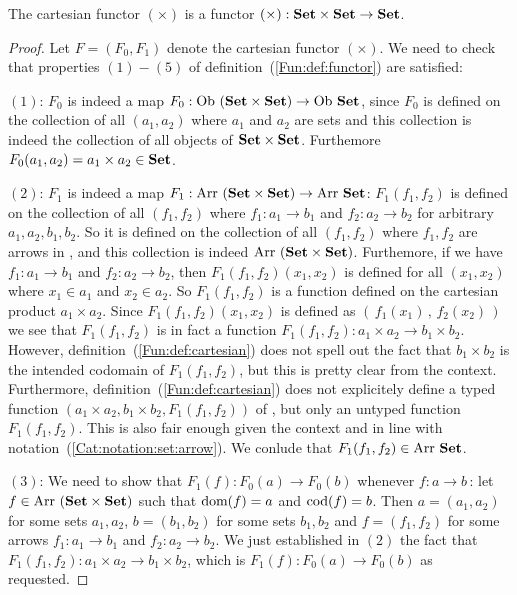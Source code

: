 \begin{prop}\label{Fun:prop:cartesian}
    The cartesian functor $(\times)$ is a functor $(\times):\mbox{\bf Set}\times\mbox{\bf Set}
    \to\mbox{\bf Set}$. 
\end{prop}
\begin{proof}
    Let $F=(F_{0},F_{1})$ denote the cartesian functor $(\times)$. We need
    to check that properties $(1)-(5)$ of definition~(\ref{Fun:def:functor}) 
    are satisfied:

    $(1)$: $F_{0}$ is indeed a map $F_{0}:\ob\ (\Set\times\Set)\to\ob\ \Set$, 
    since $F_{0}$ is defined on the collection of all $(a_{1},a_{2})$ where
    $a_{1}$ and $a_{2}$ are sets and this collection is indeed the collection
    of all objects of $\mbox{\bf Set}\times\mbox{\bf Set}$. Furthemore $F_{0}(a_{1},a_{2})=
    a_{1}\times a_{2}\in\mbox{\bf Set}$.

    $(2)$: $F_{1}$ is indeed a map $F_{1}:\arr\ (\Set\times\Set)\to\arr\ \Set$:
    $F_{1}(f_{1},f_{2})$ is defined on the collection of all $(f_{1},f_{2})$
    where $f_{1}:a_{1}\to b_{1}$ and $f_{2}:a_{2}\to b_{2}$ for arbitrary
    $a_{1}, a_{2}, b_{1}, b_{2}$. So it is defined on the collection of all
    $(f_{1},f_{2})$ where $f_{1},f_{2}$ are arrows in \Set, and this collection
    is indeed $\mbox{\rm Arr}\ (\mbox{\bf Set}\times\mbox{\bf Set})$. Furthemore, if we have $f_{1}:a_{1}\to 
    b_{1}$ and $f_{2}:a_{2}\to b_{2}$, then $F_{1}(f_{1},f_{2})(x_{1},x_{2})$ is 
    defined for all $(x_{1},x_{2})$ where $x_{1}\in a_{1}$ and $x_{2}\in a_{2}$.
    So $F_{1}(f_{1},f_{2})$ is a function defined on the 
    cartesian product $a_{1}\times a_{2}$. Since $F_{1}(f_{1},f_{2})(x_{1},x_{2})$
    is defined as $(\,f_{1}(x_{1})\,,\,f_{2}(x_{2})\,)$ we see that $F_{1}
    (f_{1},f_{2})$ is in fact a function $F_{1}(f_{1},f_{2}):a_{1}\times a_{2}
    \to b_{1}\times b_{2}$. However, definition~(\ref{Fun:def:cartesian}) does
    not spell out the fact that $b_{1}\times b_{2}$ is the intended codomain
    of $F_{1}(f_{1},f_{2})$, but this is pretty clear from the context.
    Furthermore, definition~(\ref{Fun:def:cartesian}) does not explicitely 
    define a typed function $(a_{1}\times a_{2},b_{1}\times b_{2},F_{1}(f_{1},
    f_{2}))$ of \Set, but only an untyped function $F_{1}(f_{1},f_{2})$. This 
    is also fair enough given the context and in line with 
    notation~(\ref{Cat:notation:set:arrow}). We conlude that $F_{1}(f_{1},f_{2})
    \in\mbox{\rm Arr}\ \mbox{\bf Set}$.

    $(3)$: We need to show that $F_{1}(f):F_{0}(a)\to F_{0}(b)$ whenever
    $f:a\to b$\,: let $f\in\mbox{\rm Arr}\ (\mbox{\bf Set}\times\mbox{\bf Set})$ such that $\mbox{\rm dom}(f)=a$ and
    $\mbox{\rm cod}(f)=b$. Then $a=(a_{1},a_{2})$ for some sets $a_{1},a_{2}$, $b=
    (b_{1},b_{2})$ for some sets $b_{1},b_{2}$ and $f=(f_{1},f_{2})$ for some
    arrows $f_{1}:a_{1}\to b_{1}$ and $f_{2}:a_{2}\to b_{2}$. We just established
    in $(2)$ the fact that $F_{1}(f_{1},f_{2}):a_{1}\times a_{2}\to b_{1}
    \times b_{2}$, which is $F_{1}(f):F_{0}(a)\to F_{0}(b)$ as requested.


\end{proof}
